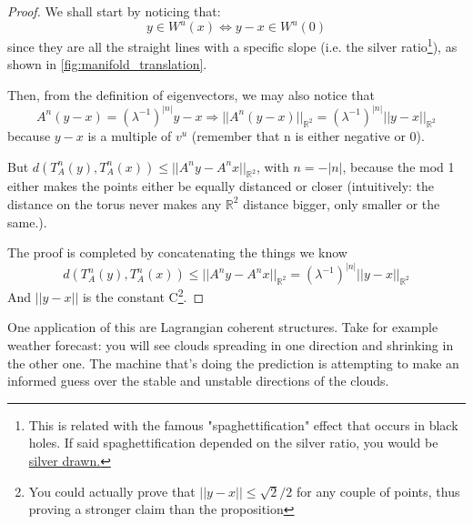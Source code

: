 \begin{proof}
    We shall start by noticing that: \begin{equation*}
        y\in W^u(x)\iff y-x\in W^u(0)
    \end{equation*} since they are all the straight lines with a specific slope (i.e. the silver ratio\footnote{This is related with the famous "spaghettification" effect that occurs in black holes. If said spaghettification depended on the silver ratio, you would be \href{https://shop.pastificiograziano.it/grigia-trafila-argento}{silver drawn.}}), as shown in \autoref{fig:manifold_translation}.

    Then, from the definition of eigenvectors, we may also notice that \begin{equation*}
        A^n(y-x)=(\lambda^{-1})^{|n|}y-x\Rightarrow||A^n(y-x)||_{\mathbb{R}^2}=(\lambda^{-1})^{|n|}||y-x||_{\mathbb{R}^2}
    \end{equation*}
    because $y-x$ is a multiple of $v^u$ (remember that n is either negative or 0). 
    
    But $d(T_A^n(y), T_A^n(x))\leq ||A^ny-A^nx||_{\mathbb{R}^2}$, with $n=-|n|$, because the mod 1 either makes the points either be equally distanced or closer (intuitively: the distance on the torus never makes any $\mathbb{R}^2$ distance bigger, only smaller or the same.). 
    
    The proof is completed by concatenating the things we know \begin{equation*}
        d(T_A^n(y), T_A^n(x))\leq ||A^ny-A^nx||_{\mathbb{R}^2}=(\lambda^{-1})^{|n|}||y-x||_{\mathbb{R}^2}
    \end{equation*}
    And $||y-x||$ is the constant C\footnote{You could actually prove that $||y-x||\leq\sqrt{2}/2$ for any couple of points, thus proving a stronger claim than the proposition}.
\end{proof}

One application of this are Lagrangian coherent structures. Take for example weather forecast: you will see clouds spreading in one direction and shrinking in the other one. The machine that's doing the prediction is attempting to make an informed guess over the stable and unstable directions of the clouds.

